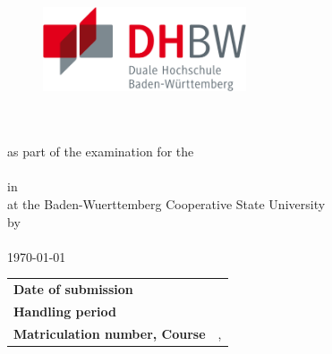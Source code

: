 
\thispagestyle{empty}
{
	\begin{titlepage}
		\enlargethispage{4cm}
		\begin{figure}
			\begin{minipage}{0.49\textwidth}
				\flushleft
			\end{minipage}
			\hfill
			\begin{minipage}{0.49\textwidth}
				\flushright
				\includegraphics[height=2.5cm]{images/logos/dhbw.pdf} 
			\end{minipage}
		\end{figure} 
		\vspace*{0.1cm}
		\begin{center}
			\huge{\textbf{\titel}}\\[1.5cm]
			\Large{\textbf{\arbeit}}\\[0.5cm]
			\normalsize{as part of the examination for the\\[1ex] \textbf{\abschluss}}\\[0.5cm]
			\Large{in \studiengang}\\[1ex]
			\normalsize{at the Baden-Wuerttemberg Cooperative State University \dhbwStandort}\\[1cm]
			\normalsize{by}\\[1ex] \Large{\textbf{\vorname\,\nachname}} \\[1cm]
			\normalsize{{\printdayoff\today}}\\[2.25cm]
			\begin{spacing}{0.8}
				\begin{tabular}{ll}
					\textbf{Date of submission}				\hspace{4.5cm}					& \printdate{\abgabeDatum}\\[0.2cm]
					\textbf{Handling period}       				&  \daterange{\bearbeitungszeitraumBeginn}{\bearbeitungszeitraumEnde}\\[0.2cm]
					\textbf{Matriculation number, Course}	   	&  \matrikelnr, \kurs\\[0.2cm]

\end{tabular}
\end{spacing}
\end{center}
\end{titlepage}}
